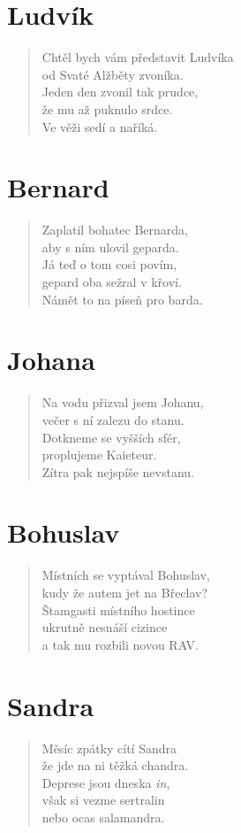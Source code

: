 \section*{Ludvík}
\begin{verse}
Chtěl bych vám představit Ludvíka\\
od Svaté Alžběty zvoníka.\\
Jeden den zvonil tak prudce,\\
že mu až puknulo srdce.\\
Ve věži sedí a naříká.
\end{verse}

\section*{Bernard}
\begin{verse}
Zaplatil bohatec Bernarda,\\
aby s ním ulovil geparda.\\
Já teď o tom cosi povím,\\
gepard oba sežral v křoví.\\
Námět to na píseň pro barda.
\end{verse}

\section*{Johana}
\begin{verse}
Na vodu přizval jsem Johanu,\\
večer s ní zalezu do stanu.\\
Dotkneme se vyšších sfér,\\
proplujeme Kaieteur.\\
Zítra pak nejspíše nevstanu.
\end{verse}

\section*{Bohuslav}
\begin{verse}
Místních se vyptával Bohuslav,\\
kudy že autem jet na Břeclav?\\
Štamgasti místního hostince\\
ukrutně nesnáší cizince\\
a tak mu rozbili novou RAV.
\end{verse}

\section*{Sandra}
\begin{verse}
Měsíc zpátky cítí Sandra\\
že jde na ni těžká chandra.\\
Deprese jsou dneska \textit{in},\\
však si vezme sertralin\\
nebo ocas salamandra.
\end{verse}

